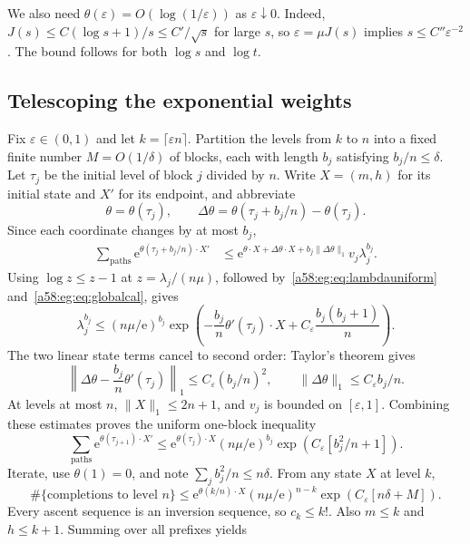 \documentclass[11pt,letterpaper]{article}
\theoremstyle{remark}
\newcommand{\ee}{\mathrm e}
\newcommand{\muval}{\mu}
\begin{document}
We also need $\theta(\varepsilon)=O(\log(1/\varepsilon))$ as $\varepsilon\downarrow0$. Indeed,
$J(s)\le C(\log s+1)/s\le C'/\sqrt s$ for large $s$, so $\varepsilon=\muval J(s)$ implies $s\le C''\varepsilon^{-2}$. The bound follows for both $\log s$ and $\log t$.

\subsection{Telescoping the exponential weights}
Fix $\varepsilon\in(0,1)$ and let $k=\lceil\varepsilon n\rceil$. Partition the levels from $k$ to $n$ into a fixed finite number $M=O(1/\delta)$ of blocks, each with length $b_j$ satisfying $b_j/n\le\delta$. Let $\tau_j$ be the initial level of block $j$ divided by $n$. Write $X=(m,h)$ for its initial state and $X'$ for its endpoint, and abbreviate
\[
 \theta=\theta(\tau_j),\qquad
 \Delta\theta=\theta(\tau_j+b_j/n)-\theta(\tau_j).
\]
Since each coordinate changes by at most $b_j$,
\begin{align}
 \sum_{\text{paths}}\ee^{\theta(\tau_j+b_j/n)\cdot X'}
 &\le\ee^{\theta\cdot X+\Delta\theta\cdot X+b_j\|\Delta\theta\|_1}
      v_j\lambda_j^{b_j}.\label{a58:eg:eq:weightchange}
\end{align}
Using $\log z\le z-1$ at $z=\lambda_j/(n\muval)$, followed by~\eqref{a58:eg:eq:lambdauniform} and~\eqref{a58:eg:eq:globalcal}, gives
\begin{equation}\label{a58:eg:eq:lambdatelescope}
 \lambda_j^{b_j}
 \le(n\muval/\ee)^{b_j}
 \exp\left(-\frac{b_j}{n}\theta'(\tau_j)\cdot X
       +C_\varepsilon\frac{b_j(b_j+1)}n\right).
\end{equation}
The two linear state terms cancel to second order: Taylor's theorem gives
\[
 \left\|\Delta\theta-\frac{b_j}{n}\theta'(\tau_j)\right\|_1
 \le C_\varepsilon(b_j/n)^2,
 \qquad \|\Delta\theta\|_1\le C_\varepsilon b_j/n.
\]
At levels at most $n$, $\|X\|_1\le2n+1$, and $v_j$ is bounded on $[\varepsilon,1]$. Combining these estimates proves the uniform one-block inequality
\begin{equation}\label{a58:eg:eq:oneblock}
 \sum_{\text{paths}}\ee^{\theta(\tau_{j+1})\cdot X'}
 \le\ee^{\theta(\tau_j)\cdot X}(n\muval/\ee)^{b_j}
      \exp\left(C_\varepsilon[b_j^2/n+1]\right).
\end{equation}
Iterate, use $\theta(1)=0$, and note $\sum_jb_j^2/n\le n\delta$. From any state $X$ at level $k$,
\[
 \#\{\text{completions to level }n\}
 \le\ee^{\theta(k/n)\cdot X}(n\muval/\ee)^{n-k}
     \exp(C_\varepsilon[n\delta+M]).
\]
Every ascent sequence is an inversion sequence, so $c_k\le k!$. Also $m\le k$ and $h\le k+1$. Summing over all prefixes yields
\end{document}
